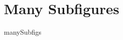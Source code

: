 %
\appendix%
%
\ifAppendices%
\chapter{Many Subfigures}%
\label{app:manySubFigs}%
{manySubfigs}%
\else\fi%